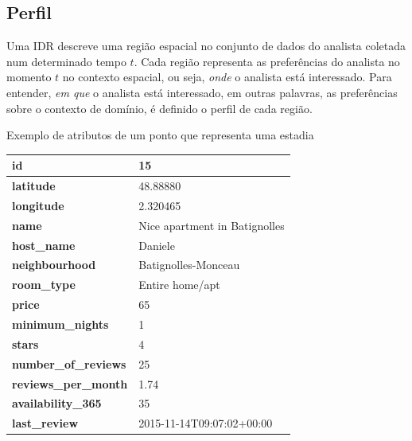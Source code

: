 
\subsection{Perfil}

Uma IDR descreve uma região espacial no conjunto de dados do analista coletada num determinado tempo $t$. Cada região representa as preferências do analista no momento $t$ no contexto espacial, ou seja, {\em onde} o analista está interessado. Para entender, {\em em que} o analista está interessado, em outras palavras, as preferências sobre o contexto de domínio, é definido o perfil de cada região.

\begin{quadro}[]
	\caption{Exemplo de atributos de um ponto que representa uma estadia}
	\label{table:atributos}
	\centering
	\begin{tabular}{|l|l|}
		\hline
		\textbf{id}                  & 15                             \\ \hline
		\textbf{latitude}            & 48.88880                       \\ \hline
		\textbf{longitude}           & 2.320465                       \\ \hline
		\textbf{name}                & Nice apartment in Batignolles \\ \hline
		\textbf{host\_name}          & Daniele                        \\ \hline
		\textbf{neighbourhood}       & Batignolles-Monceau            \\ \hline
		\textbf{room\_type}          & Entire home/apt                \\ \hline
		\textbf{price}               & 65                             \\ \hline
		\textbf{minimum\_nights}     & 1                              \\ \hline
		\textbf{stars}               & 4                              \\ \hline
		\textbf{number\_of\_reviews} & 25                             \\ \hline
		\textbf{reviews\_per\_month} & 1.74                           \\ \hline
		\textbf{availability\_365}   & 35                             \\ \hline
		\textbf{last\_review}        & 2015-11-14T09:07:02+00:00      \\ \hline
	\end{tabular}
	\mfonte
\end{quadro}

